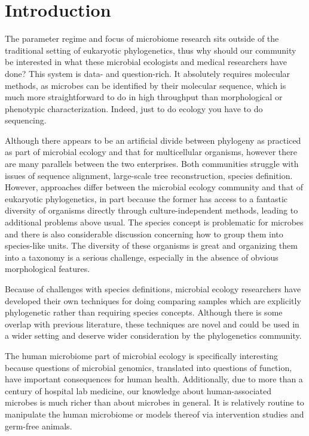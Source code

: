 \documentclass{amsart}
\begin{document}
\section{Introduction}

The parameter regime and focus of microbiome research sits outside of the traditional setting of eukaryotic phylogenetics, thus why should our community be interested in what these microbial ecologists and medical researchers have done?
This system is data- and question-rich.
It absolutely requires molecular methods, as microbes can be identified by their molecular sequence, which is much more straightforward to do in high throughput than morphological or phenotypic characterization.
Indeed, just to do ecology you have to do sequencing.

Although there appears to be an artificial divide between phylogeny as practiced as part of microbial ecology and that for multicellular organisms, however there are many parallels between the two enterprises.
Both communities struggle with issues of sequence alignment, large-scale tree reconstruction, species definition.
However, approaches differ between the microbial ecology community and that of eukaryotic phylogenetics, in part because the former has access to a fantastic diversity of organisms directly through culture-independent methods, leading to additional problems above usual.
The species concept is problematic for microbes and there is also considerable discussion concerning how to group them into species-like units.
The diversity of these organisms is great and organizing them into a taxonomy is a serious challenge, especially in the absence of obvious morphological features.

Because of challenges with species definitions, microbial ecology researchers have developed their own techniques for doing comparing samples which are explicitly phylogenetic rather than requiring species concepts.
Although there is some overlap with previous literature, these techniques are novel and could be used in a wider setting and deserve wider consideration by the phylogenetics community.

The human microbiome part of microbial ecology is specifically interesting because questions of microbial genomics, translated into questions of function, have important consequences for human health.
Additionally, due to more than a century of hospital lab medicine, our knowledge about human-associated microbes is much richer than about microbes in general.
It is relatively routine to manipulate the human microbiome or models thereof via intervention studies and germ-free animals.
\end{document}
